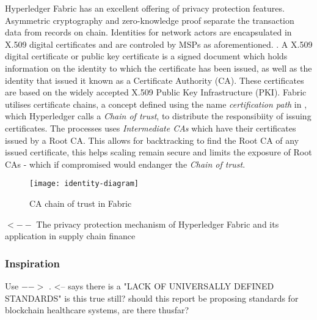 Hyperledger Fabric has an excellent offering of privacy protection features.
Asymmetric cryptography and zero-knowledge proof separate the transaction data from records on chain. 
Identities for network actors are encapsulated in X.509 digital certificates and are controled by MSPs as aforementioned. \cite{noauthor_identity_nodate}. 
A X.509 digital certificate or public key certificate is a signed document which holds information on the identity to which the certificate has been issued, as well as the identity that issued it known as a Certificate Authority (CA). 
These certificates are based on the widely accepted X.509 Public Key Infrastructure (PKI). \cite{cooper_internet_nodate}
Fabric utilises certificate chains, a concept defined using the name \emph{certification path} in \cite{cooper_internet_nodate}, which Hyperledger calls a \emph{Chain of trust}, to distribute the responsibiity of issuing certificates. 
The processes uses \emph{Intermediate CAs} which have their certificates issued by a Root CA. 
This allows for backtracking to find the Root CA of any issued certificate, this helps scaling remain secure and limits the exposure of Root CAs - which if compromised would endanger the \emph{Chain of trust}. \cite{noauthor_identity_nodate}

\begin{figure}[h]
  \texttt{[image: identity-diagram]}
  \caption{CA chain of trust in Fabric}
\end{figure}

\cite{ma_privacy_2019} $<--$ The privacy protection mechanism of Hyperledger Fabric and its application in supply chain finance





\subsubsection{Inspiration} %
Use $-->$ \cite{yuan_design_2018}. <-- says there is a "LACK OF UNIVERSALLY DEFINED STANDARDS" is this true still? should this report be proposing standards for blockchain healthcare systems, are there thusfar?

